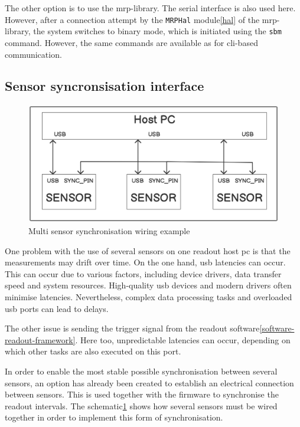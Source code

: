 The other option is to use the \gls{mrp}-library. The serial interface
is also used here. However, after a connection attempt by the
\passthrough{\lstinline!MRPHal!} module\ref{hal} of the
\gls{mrp}-library, the system switches to binary mode, which is
initiated using the \passthrough{\lstinline!sbm!} command. However, the
same commands are available as for \gls{cli}-based communication.

\hypertarget{sensor-syncronsisation-interface}{%
\subsection{Sensor syncronsisation
interface}\label{sensor-syncronsisation-interface}}

\begin{figure}
\centering
\includegraphics{./generated_images/border_Multi_sensor_synchronisation_wiring_example.png}
\caption{Multi sensor synchronisation wiring example
\label{Multi_sensor_synchronisation_wiring_example.png}}
\end{figure}

One problem with the use of several sensors on one readout host \gls{pc}
is that the measurements may drift over time. On the one hand, \gls{usb}
latencies can occur. This can occur due to various factors, including
device drivers, data transfer speed and system resources. High-quality
\gls{usb} devices and modern drivers often minimise latencies.
Nevertheless, complex data processing tasks and overloaded \gls{usb}
ports can lead to delays.

The other issue is sending the trigger signal from the readout
software\ref{software-readout-framework}. Here too, unpredictable
latencies can occur, depending on which other tasks are also executed on
this port.

In order to enable the most stable possible synchronisation between
several sensors, an option has already been created to establish an
electrical connection between sensors. This is used together with the
firmware to synchronise the readout intervals. The
schematic\ref{Multi_sensor_synchronisation_wiring_example.png} shows how
several sensors must be wired together in order to implement this form
of synchronisation.

